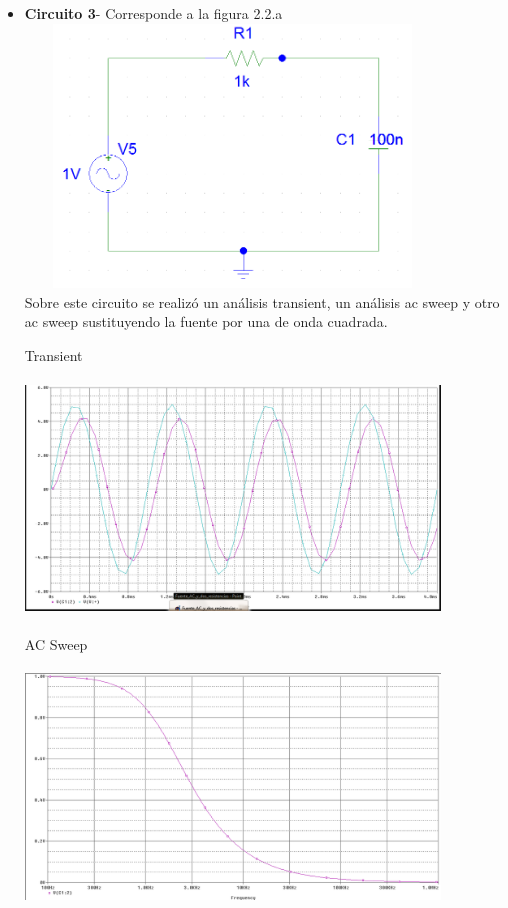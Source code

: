 \documentclass[12pt]{article}
\begin{document}
\begin{itemize}
		\item \textbf{Circuito 3}- Corresponde a la figura 2.2.a\\ 
		
		\includegraphics[width=11cm,height=7cm]{Img/ac_rc.png}\\
		
		\noindent Sobre este circuito se realizó un análisis transient, un análisis ac sweep y otro ac sweep sustituyendo la fuente por una de onda cuadrada.
		
		\noindent Transient\\
		
		\includegraphics[width=11cm,height=7cm]{Img/Fuente_AC_RC.png}\\
		
		\noindent AC Sweep\\
		
		\includegraphics[width=11cm,height=7cm]{Img/Fuente_AC_RC_AC_sweep.png}\\
		

\end{itemize}
\end{document}
